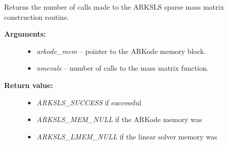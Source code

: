 \documentclass[letterpaper,10pt,english]{sphinxmanual}
\begin{document}

\begin{fulllineitems}
\label{c_interface/User_callable:ARKSlsGetNumMassEvals}
Returns the number of calls made to the ARKSLS sparse
mass matrix construction routine.
\begin{description}
\item[{\textbf{Arguments:}}] \leavevmode\begin{itemize}
\item {} 
\emph{arkode\_mem} -- pointer to the ARKode memory block.

\item {} 
\emph{nmevals} -- number of calls to the mass matrix function.

\end{itemize}

\item[{\textbf{Return value:}}] \leavevmode\begin{itemize}
\item {} 
\emph{ARKSLS\_SUCCESS} if successful

\item {} 
\emph{ARKSLS\_MEM\_NULL} if the ARKode memory was 

\item {} 
\emph{ARKSLS\_LMEM\_NULL} if the linear solver memory was 

\end{itemize}

\end{description}

\end{fulllineitems}

\end{document}
